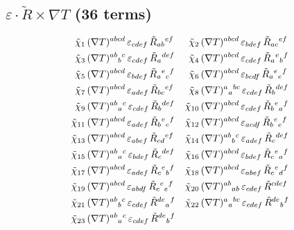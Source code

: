 \documentclass[12pt,a4paper]{article}
\newcommand{\Rt}{\tilde{R}}         %
\newcommand{\del}{\nabla}            %
\newcommand{\eps}{\varepsilon}       %
\begin{document}
\subsection{$\eps \cdot \Rt \times \del T$ (36 terms)}
{\small
\begin{align}
  \tilde{\chi}_1&\, (\del T)^{abcd}\,\eps_{cdef}\,\Rt_{ab}{}^{ef}  &
  \tilde{\chi}_2&\, (\del T)^{abcd}\,\eps_{bdef}\,\Rt_{ac}{}^{ef}  \notag\\
  \tilde{\chi}_3&\, (\del T)^{ab}{}_{b}{}^{c}\,\eps_{cdef}\,\Rt_{a}{}^{def}  &
  \tilde{\chi}_4&\, (\del T)^{abcd}\,\eps_{cdef}\,\Rt_{a}{}^{e}{}_{b}{}^{f}  \notag\\
  \tilde{\chi}_5&\, (\del T)^{abcd}\,\eps_{bdef}\,\Rt_{a}{}^{e}{}_{c}{}^{f}  &
  \tilde{\chi}_6&\, (\del T)^{abcd}\,\eps_{bcdf}\,\Rt_{a}{}^{e}{}_{e}{}^{f}  \notag\\
  \tilde{\chi}_7&\, (\del T)^{abcd}\,\eps_{adef}\,\Rt_{bc}{}^{ef}  &
  \tilde{\chi}_8&\, (\del T)^{a}{}_{a}{}^{bc}\,\eps_{cdef}\,\Rt_{b}{}^{def}  \notag\\
  \tilde{\chi}_9&\, (\del T)^{ab}{}_{a}{}^{c}\,\eps_{cdef}\,\Rt_{b}{}^{def}  &
  \tilde{\chi}_{10}&\, (\del T)^{abcd}\,\eps_{cdef}\,\Rt_{b}{}^{e}{}_{a}{}^{f}  \notag\\
  \tilde{\chi}_{11}&\, (\del T)^{abcd}\,\eps_{adef}\,\Rt_{b}{}^{e}{}_{c}{}^{f}  &
  \tilde{\chi}_{12}&\, (\del T)^{abcd}\,\eps_{acdf}\,\Rt_{b}{}^{e}{}_{e}{}^{f}  \notag\\
  \tilde{\chi}_{13}&\, (\del T)^{abcd}\,\eps_{abef}\,\Rt_{cd}{}^{ef}  &
  \tilde{\chi}_{14}&\, (\del T)^{ab}{}_{b}{}^{c}\,\eps_{adef}\,\Rt_{c}{}^{def}  \notag\\
  \tilde{\chi}_{15}&\, (\del T)^{ab}{}_{a}{}^{c}\,\eps_{bdef}\,\Rt_{c}{}^{def}  &
  \tilde{\chi}_{16}&\, (\del T)^{abcd}\,\eps_{bdef}\,\Rt_{c}{}^{e}{}_{a}{}^{f}  \notag\\
  \tilde{\chi}_{17}&\, (\del T)^{abcd}\,\eps_{adef}\,\Rt_{c}{}^{e}{}_{b}{}^{f}  &
  \tilde{\chi}_{18}&\, (\del T)^{abcd}\,\eps_{abef}\,\Rt_{c}{}^{e}{}_{d}{}^{f}  \notag\\
  \tilde{\chi}_{19}&\, (\del T)^{abcd}\,\eps_{abdf}\,\Rt_{c}{}^{e}{}_{e}{}^{f}  &
  \tilde{\chi}_{20}&\, (\del T)^{ab}{}_{ab}\,\eps_{cdef}\,\Rt^{cdef}  \notag\\
  \tilde{\chi}_{21}&\, (\del T)^{ab}{}_{b}{}^{c}\,\eps_{cdef}\,\Rt^{de}{}_{a}{}^{f}  &
  \tilde{\chi}_{22}&\, (\del T)^{a}{}_{a}{}^{bc}\,\eps_{cdef}\,\Rt^{de}{}_{b}{}^{f}  \notag\\
  \tilde{\chi}_{23}&\, (\del T)^{ab}{}_{a}{}^{c}\,\eps_{cdef}\,\Rt^{de}{}_{b}{}^{f}  &

\end{align}}
\end{document}
